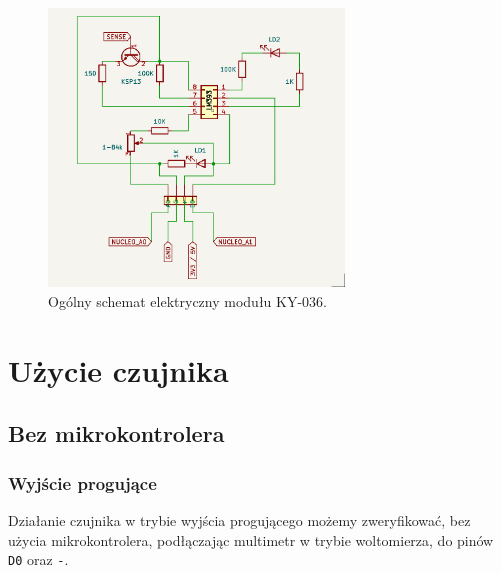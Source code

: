 \documentclass[11pt, a4paper]{article}
\begin{document}
\newpage

\begin{figure}[h!]
    \centering
    \includegraphics[width=0.7\textwidth]{fig/KY-036/284156354_331751615703128_964279712853339648_n.png}
    \caption{Ogólny schemat elektryczny modułu KY-036.}
    \label{fig:_schemat_modulu}
\end{figure}


\newpage

\section{Użycie czujnika}
\subsection{Bez mikrokontrolera}
\subsubsection{Wyjście progujące}

Działanie czujnika w trybie wyjścia progującego możemy zweryfikować, bez użycia mikrokontrolera, podłączając multimetr
w trybie woltomierza, do pinów \texttt{D0} oraz \texttt{-}.
\end{document}
